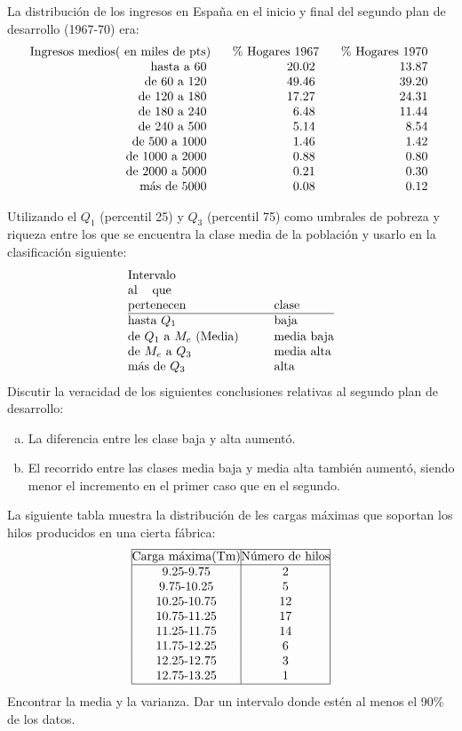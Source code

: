 \documentclass[12pt]{article}
\begin{document}
\begin{prob}La distribución de los ingresos en España en el
inicio y final del segundo plan de desarrollo (1967-70) era:
$$\vbox{\halign{\offinterlineskip\strut\hskip0.25cm \hfill #
\hskip0.25cm& \hskip0.25cm \hfill # \hskip0.25cm&\hskip0.25cm \hfill # \hskip0.25cm\cr
 Ingresos medios( en miles de pts)& \%  Hogares 1967& \% Hogares
1970\cr hasta a 60 & 20.02 & 13.87\cr de 60 a 120 & 49.46 & 39.20\cr de 120 a 180 & 17.27
& 24.31\cr de 180 a 240 & 6.48 & 11.44\cr de 240 a 500 & 5.14 & 8.54\cr de 500 a 1000 &
1.46 & 1.42\cr de 1000 a 2000 & 0.88 & 0.80\cr de 2000 a 5000 & 0.21 & 0.30\cr
 más de 5000 & 0.08 & 0.12\cr
}}$$

Utilizando el  $Q_{1}$ (percentil 25) y $Q_{3}$ (percentil 75) como umbrales de pobreza y
riqueza entre los  que se encuentra la clase media de la población y usarlo en la
clasificación siguiente:
$$
\vbox{\halign{\strut\offinterlineskip\strut #&\hskip1cm#&#&#\cr \vbox{\halign{\strut #\cr
Intervalo \cr al que \cr pertenecen\cr}}& clase&&\cr \noalign{\hrule} hasta
$Q_{1}$\hfill & baja&&\cr \vbox{\halign{\strut \offinterlineskip#\cr de $Q_{1}$ a $M_{e}$
(Media)\hfill \cr de  $M_{e}$  a $Q_{3}$\hfill\cr}}&
$
\vbox{\halign{\strut \offinterlineskip#\cr media baja\hfill\cr
 media alta\hfill\cr}}
$&&\cr
 más de $Q_{3}$\hfill & alta\hfill&&\cr}}
$$
Discutir la veracidad de los siguientes conclusiones relativas al segundo plan de
desarrollo:
\begin{enumerate}[a)]
\item {La diferencia entre les clase baja y alta aumentó.}
\item  {El recorrido entre las clases media baja  y media  alta
también aumentó, siendo  menor el incremento en el primer caso que en el segundo.}
\end{enumerate}
\end{prob}


\begin{prob}La siguiente tabla muestra la distribución de les
cargas máximas que soportan los hilos producidos en una cierta fábrica:
$$\vbox{\halign{\offinterlineskip\strut
\vrule \hfill#\hfill\vrule&\hfill#\hfill\vrule \cr \noalign{\hrule} Carga
máxima(Tm)&Número de hilos\cr \noalign{\hrule} 9.25-9.75&2\cr 9.75-10.25&5\cr
10.25-10.75&12\cr 10.75-11.25&17\cr 11.25-11.75&14\cr 11.75-12.25&6\cr 12.25-12.75&3\cr
12.75-13.25&1\cr \noalign{\hrule} }}$$ Encontrar la media y la varianza. Dar un intervalo
donde estén  al menos el 90\% de los datos. \
\end{prob}
\end{document}

